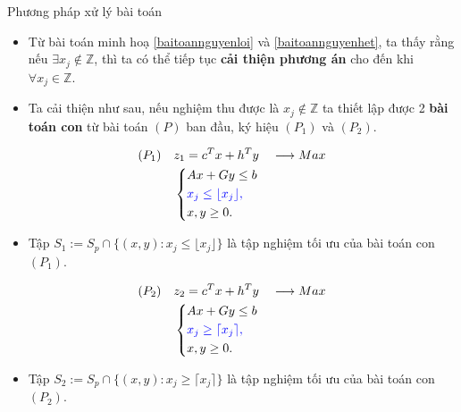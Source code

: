 \documentclass[10pt]{beamer}
\begin{document}
\begin{frame}{Phương pháp xử lý bài toán}
\large
\begin{itemize}
\item<1-> Từ bài toán minh hoạ \eqref{baitoannguyenloi} và \eqref{baitoannguyenhet}, ta thấy rằng nếu $\exists x_j \notin \mathbb{Z}$, thì ta có thể tiếp tục \textbf{cải thiện phương án} cho đến khi $\forall x_j \in \mathbb{Z}$. 
\bigskip
\item<2-> Ta cải thiện như sau, nếu nghiệm thu được là $x_j \notin \mathbb{Z}$ ta thiết lập được 2 \textbf{bài toán con} từ bài toán $(P)$ ban đầu, ký hiệu $(P_1)$ và $(P_2)$.
\end{itemize}
\end{frame}

\begin{frame}
\begin{equation}
    \begin{split}
    (P_1) \quad & z_1=c^Tx+h^Ty \quad \longrightarrow Max \\
                & \left\{\begin{split}
                    &Ax+Gy \leq  b \\
                    &\color{blue} x_j \leq \lfloor x_j \rfloor , \\
                    &x,y \geq 0.
                \end{split}\right.    
    \end{split}
\end{equation}
\begin{itemize}
\item Tập $S_1:=S_p \cap \{ (x,y): x_j \leq \lfloor x_j \rfloor \}$ là tập nghiệm tối ưu của bài toán con $(P_1)$.
\end{itemize}
\end{frame}

\begin{frame}
\begin{equation}
    \begin{split}
    (P_2) \quad & z_2=c^Tx+h^Ty \quad \longrightarrow Max \\
                & \left\{\begin{split}
                    &Ax+Gy \leq  b \\
                    &\color{blue} x_j \geq \lceil x_j \rceil , \\
                    &x,y \geq 0.
                \end{split}\right.    
    \end{split}
\end{equation}
\begin{itemize}
\item Tập $S_2:=S_p \cap \{ (x,y): x_j \geq \lceil x_j \rceil \}$ là tập nghiệm tối ưu của bài toán con $(P_2)$.
\end{itemize}
\end{frame}
\end{document}
